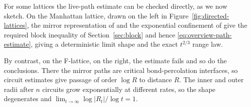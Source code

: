 \documentclass[11pt]{amsart}
\theoremstyle{plain}
\theoremstyle{definition}
\begin{document}
	For some lattices the live-path estimate can be checked directly, as we now sketch. 
	On the Manhattan lattice, drawn on the left in Figure~\ref{fig:directed-lattices}, the mirror representation of \citet{FlorescuLevinePeres2016} and the exponential confinement of \citet[Theorem~1.2]{Li2021} give the required block inequality
	of Section~\ref{sec:block} and hence \eqref{eq:overview-path-estimate}, giving a deterministic limit shape and the
	exact $t^{2/3}$ range law.

	By contrast, on the F-lattice, on the right, the estimate fails and so do the
	conclusions.  There the mirror paths are critical bond-percolation interfaces, so circuit
	estimates give passage of order $\log R$ to distance $R$.  The inner and outer
	radii after $n$ circuits grow exponentially at different rates, so the shape
	degenerates and $\lim_{t\to\infty}\log|R_t|/\log t=1$.
\end{document}
